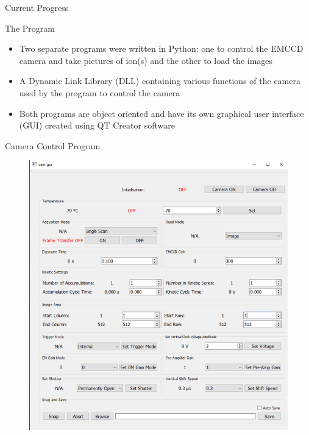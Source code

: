 \documentclass{beamer}
\begin{document}
\begin{frame}[noframenumbering]

Current Progress



\end{frame}




\begin{frame}{The Program}

\begin{itemize}
\item Two separate programs were written in Python: one to control the EMCCD camera and take pictures of ion(s) and the other to load the images 
\bigskip
\item A Dynamic Link Library (DLL) containing various functions of the camera used by the program to control the camera
\bigskip
\item Both programs are object oriented and have its own graphical user interface (GUI) created using QT Creator software

\end{itemize}


\end{frame}

\begin{frame}{Camera Control Program}

\begin{figure}
\centering
\includegraphics[scale=0.4]{Figures/cam_program.PNG}
\end{figure}


\end{frame}
\end{document}
